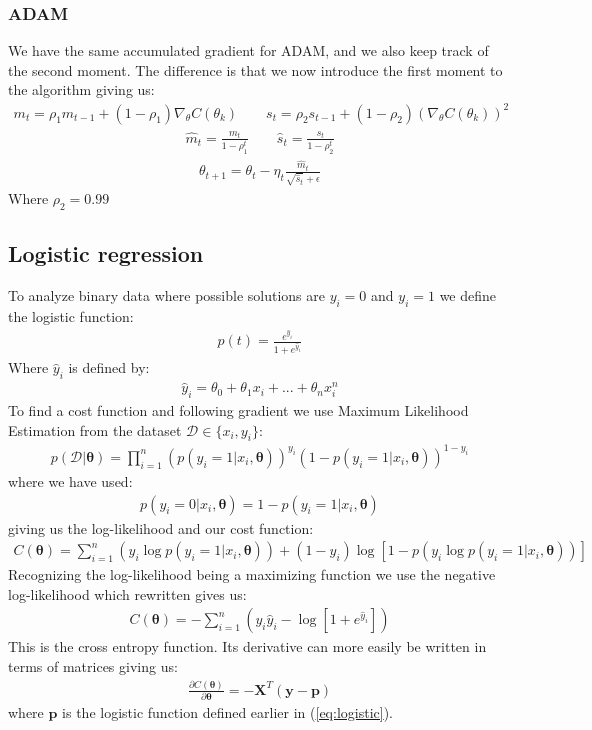 \documentclass[11pt]{article}
\begin{document}
\subsubsection*{ADAM}
We have the same accumulated gradient for ADAM, and we also keep track of the second moment. The difference is that we now introduce the first moment to the algorithm giving us:
\begin{align*}
    m_t = \rho_1 m_{t-1} + (1-\rho_1)\nabla_\theta C(\theta_k) \quad\quad s_t = \rho_2 s_{t-1} + (1- \rho_2)(\nabla_\theta C(\theta_k))^2
\end{align*}
\begin{align*}
    \hat{m}_t = \frac{m_t }{1-\rho_1^t} \quad\quad \hat{s}_t = \frac{s_t }{1- \rho_2^t}
\end{align*}
\begin{align*}
    \theta_{t+1} = \theta_t - \eta_t \frac{\hat{m}_t}{\sqrt{\hat{s}_t} + \epsilon }
\end{align*}
Where $\rho_2=0.99$
\subsection{Logistic regression}
To analyze binary data where possible solutions are $y_i=0$ and $y_i=1$ we define the logistic function:
\begin{align}
    \label{eq:logistic}
    p(t) =  \frac{e^{\hat{y}_i}}{1+e^{\hat{y}_i}}
\end{align}
Where $\hat{y}_i$ is defined by:
\begin{align*}
    \hat{y}_i = \theta_0 + \theta_1 x_i +...+ \theta_n x_i^n
\end{align*}
To find a cost function and following gradient we use Maximum Likelihood Estimation from the dataset $\mathcal{D} \in \{x_i, y_i\}$:
\begin{align*}
    p(\mathcal{D}|\boldsymbol{\theta}) = \prod_{i=1}^n (p(y_i = 1|x_i,\boldsymbol{\theta}))^{y_i}\left( 1- p(y_i = 1 | x_i, \boldsymbol{\theta})\right)^{1-y_i}
\end{align*}
where we have used:
\begin{align*}
    p(y_i=0|x_i, \boldsymbol{\theta} ) = 1 - p(y_i=1 | x_i, \boldsymbol{\theta})
\end{align*}
giving us the log-likelihood and our cost function:
\begin{align*}
    C(\boldsymbol{\theta}) = \sum_{i=1}^n (y_i \log p(y_i =1 | x_i, \boldsymbol{\theta})) + (1- y_i) \log [1 - p(y_i \log p(y_i =1 | x_i, \boldsymbol{\theta}))]
\end{align*}
Recognizing the log-likelihood being a maximizing function we use the negative log-likelihood which rewritten gives us:
\begin{align*}
    C(\boldsymbol{\theta}) = -\sum_{i=1}^n (y_i \hat{y}_i - \log [1 + e^{\hat{y}_i}])
\end{align*}
This is the cross entropy function.
Its derivative can more easily be written in terms of matrices giving us:
\begin{align*}
    \frac{\partial C(\boldsymbol{\theta})}{\partial \boldsymbol{\theta}} = - \boldsymbol{X}^T (\boldsymbol{y}- \boldsymbol{p})
\end{align*}
where $\boldsymbol{p}$ is the logistic function defined earlier in (\ref{eq:logistic}).
\end{document}
